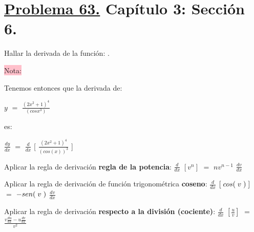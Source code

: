 \documentclass[12pt]{article}
\begin{document}
\pagestyle{empty} 
\setlength{\parindent}{0pt}

\sffamily 

\section*{{\textcolor{tropicalrainforest}{{\underline{Problema 63.}}}} {\textcolor{yellow(munsell)}{Capítulo 3:} {\textcolor{wisteria}{Sección 6.}}}} \vspace{0.1cm}

Hallar la derivada de la función: . \vspace{0.3cm} 

\begin{center}
\colorbox{pink}{Nota:}  
\end{center}


Tenemos entonces que la derivada de: 
\begin{center} {\Large{
    $y$ $=$ $\frac{(2x^{2}+1)^{4}}{(cosx^{3})}$}}
\end{center}

\begin{center}
    es:
\end{center}

\begin{center}
{\Large{$\frac{dy}{dx}$ $=$ $\frac{d}{dx}$}} {\Large{[}}  
{\Large{$\frac{(2x^{2}+1)^{4}}{(cos(x))^{3}}$}}\hspace{0.2cm} {\Large{]}}
\end{center}\vspace{0.3cm} 

Aplicar la regla de derivación {\textbf{regla de la potencia}}: {\Large{$\frac{d}{dx}$}} $[v^{n}]$ $=$  {\Large{$n v^{n-1}$ $\frac{dv}{dx}$}} \vspace{0.3cm}

Aplicar la regla de derivación de función trigonométrica {\textbf{coseno}}: {\Large{$\frac{d}{dx}$}} $[\hspace{0.1cm}cos(\hspace{0.1cm}v\hspace{0.1cm})\hspace{0.1cm}]$ $=$  $- sen(\hspace{0.1cm}v\hspace{0.1cm})$ {\Large{$\frac{dv}{dx}$}} \vspace{0.3cm}

Aplicar la regla de derivación {\textbf{respecto a la división (cociente)}}: {\Large{$\frac{d}{dx}$}} {\Large{$[\frac{u}{v}]$}} $=$   {\LARGE{$\frac{v\frac{du}{dx}-u\frac{dv}{dx}}{v^{2}}$}} \vspace{0.3cm}
\end{document}
